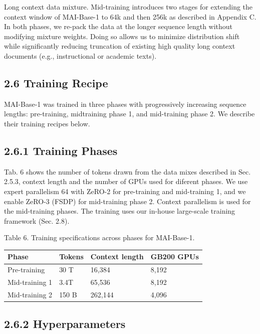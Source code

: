 \documentclass[
  10
]{article}
\newcounter{none} %
\begin{document}
Long context data mixture. Mid-training introduces two stages for
extending the context window of MAI-Base-1 to 64k and then 256k as
described in Appendix C. In both phases, we re-pack the data at the
longer sequence length without modifying mixture weights. Doing so
allows us to minimize distribution shift while significantly reducing
truncation of existing high quality long context documents (e.g.,
instructional or academic texts).

\subsection{2.6 Training Recipe}\label{training-recipe}

MAI-Base-1 was trained in three phases with progressively increasing
sequence lengths: pre-training, midtraining phase 1, and mid-training
phase 2. We describe their training recipes below.

\subsection{2.6.1 Training Phases}\label{training-phases}

Tab. 6 shows the number of tokens drawn from the data mixes described in
Sec. 2.5.3, context length and the number of GPUs used for diferent
phases. We use expert parallelism 64 with ZeRO-2 for pre-training and
mid-training 1, and we enable ZeRO-3 (FSDP) for mid-training phase 2.
Context parallelism is used for the mid-training phases. The training
uses our in-house large-scale training framework (Sec. 2.8).

Table 6. Training specifications across phases for MAI-Base-1.

{\def\LTcaptype{none} %
\begin{longtable}[]{@{}|l|l|l|l|@{}}
\toprule\noalign{}
\endhead
\bottomrule\noalign{}
\endlastfoot
\hline
Phase & Tokens & Context length & GB200 GPUs \\
\hline
Pre-training & 30 T & 16,384 & 8,192 \\
\hline
Mid-training 1 & 3.4T & 65,536 & 8,192 \\
\hline
Mid-training 2 & 150 B & 262,144 & 4,096 \\
\hline
\end{longtable}
}

\subsection{2.6.2 Hyperparameters}\label{hyperparameters}
\end{document}
